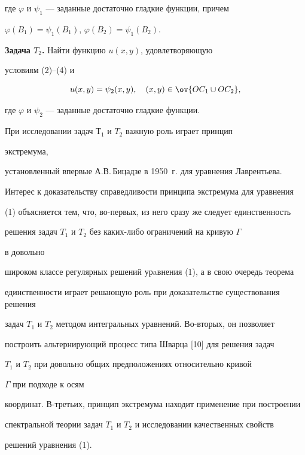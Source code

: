 где $\varphi$ и $\psi_1$ --- заданные достаточно гладкие функции, причем 


$\varphi (B_1)=\psi_1(B_1)$, $\varphi (B_2)=\psi_1(B_2)$.


\medskip





{\bf Задача $T_2$.} Найти функцию $u(x,y)$, удовлетворяющую 


условиям (2)--(4) и 


$$


u(x,y)=\psi_2(x,y),\quad (x,y)\in \ov {OC_1\cup OC_2},


$$


где $\varphi$ и $\psi_2$ --- заданные достаточно гладкие функции.


\medskip





При исследовании задач $Т_1$ и $T_2$ важную роль играет принцип 


экстремума, 


установленный впервые А.В.\,Бицадзе в 1950~г. для уравнения Лаврентьева.


Интерес к доказательству справедливости принципа экстремума для уравнения


(1) объясняется тем, что, во-первых, из него сразу же следует единственность


решения задач $T_1$ и $T_2$ без каких-либо ограничений на кривую $\Gamma$


в довольно 


широком классе регулярных решений урaвнения (1), а в свою очередь теорема 


единственности играет решающую роль при доказательстве существования решения 


задач $T_1$ и $T_2$ методом интегральных уравнений. Во-вторых, он позволяет


построить альтернирующий процесс типа Шварца [10] для решения задач


$T_1$ и $T_2$ при довольно общих предположениях относительно кривой


$\Gamma$ при подходе к осям 


координат. В-третьих, принцип экстремума находит применение при построении


спектральной теории задач $T_1$ и $T_2$ и исследовании качественных свойств


решений уравнения (1).





